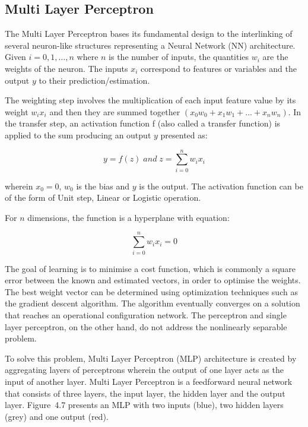 \documentclass[conference]{IEEEtran}
\begin{document}
\subsection{Multi Layer Perceptron}

The Multi Layer Perceptron bases its fundamental design to the
interlinking of several neuron-like structures representing a Neural
Network (NN) architecture. Given $i = 0,1,\ldots,n$ where $n$ is the
number of inputs, the quantities $w_{i}$ are the weights of the
neuron. The inputs $x_{i}$ correspond to features or variables and the
output $y$ to their prediction/estimation.

The weighting step involves the multiplication of each input feature value by its weight ${w_ix_i}$ and then they are summed together $(x_{0}w_{0} + x_{1}w_{1} + ... + x_{n}w_{n})$. In the transfer step, an activation function f (also called a transfer function) is applied to the sum producing an output $y$
presented as: 

\begin{equation}
    y = f(z)\;and\;z = \sum_{i=0}^{n} w_{i}x_{i}
\end{equation}

wherein $x_{0} = 0$, $w_{0}$ is the bias and $y$ is the output. The
activation function can be of the form of Unit step, Linear or
Logistic operation.

For $n$
dimensions, the function is a hyperplane with equation:

\begin{equation}
    \sum_{i=0}^{n} w_{i}x_{i} = 0
\end{equation}

The goal of learning is to minimise a cost function, which is commonly a square error between the known and estimated vectors, in order to optimise the weights. The best weight vector can be determined using optimization techniques such as the gradient descent algorithm. The algorithm eventually converges on a solution that reaches an operational configuration network. The perceptron and single layer perceptron, on the other hand, do not address the nonlinearly separable problem.

To solve this problem, Multi Layer Perceptron (MLP) architecture is
created by aggregating layers of perceptrons wherein the output of one
layer acts as the input of another layer. Multi Layer Perceptron
\cite{C} is a feedforward neural network that consists of three
layers, the input layer, the hidden layer and the output
layer. Figure~4.7 presents an MLP with two inputs (blue), two hidden
layers (grey) and one output (red).
\end{document}
